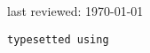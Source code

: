 \documentclass[letter,10pt]{article}
\begin{document}
\begin{small}

	\begin{flushright}
		last reviewed: \today
	\end{flushright}
\end{small}

\begin{center}
	{\scriptsize \texttt{typesetted using}}\\{\small \texttt{\LaTeXe}}\pagebreak
\end{center}
\end{document}
